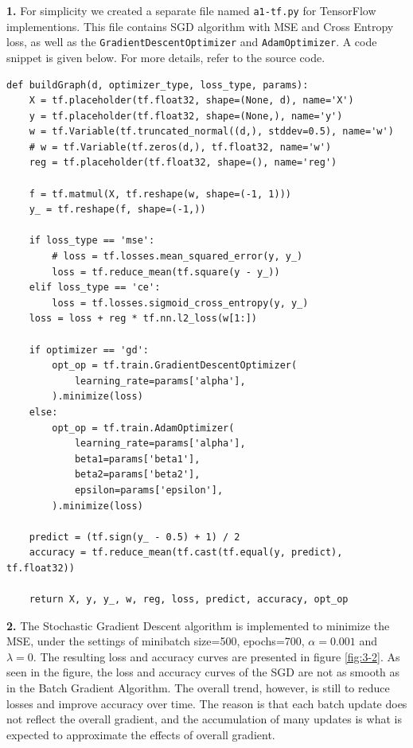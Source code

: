 \documentclass[12pt]{article}
\newenvironment{problem}[2][Problem]{\begin{trivlist}
\item[\hskip \labelsep {\bfseries #1}\hskip \labelsep {\bfseries #2.}]}{\end{trivlist}}
\begin{document}
\vspace{5mm}
\newpage
\begin{problem}{3}

\textbf{1. } For simplicity we created a separate file named \texttt{a1-tf.py} for TensorFlow implementions. This file contains SGD algorithm with MSE and Cross Entropy loss, as well as the \texttt{GradientDescentOptimizer} and \texttt{AdamOptimizer}. A code snippet is given below. For more details, refer to the source code.

\begin{lstlisting}[frame=single]
def buildGraph(d, optimizer_type, loss_type, params):
    X = tf.placeholder(tf.float32, shape=(None, d), name='X')
    y = tf.placeholder(tf.float32, shape=(None,), name='y')
    w = tf.Variable(tf.truncated_normal((d,), stddev=0.5), name='w')
    # w = tf.Variable(tf.zeros(d,), tf.float32, name='w')
    reg = tf.placeholder(tf.float32, shape=(), name='reg')

    f = tf.matmul(X, tf.reshape(w, shape=(-1, 1)))
    y_ = tf.reshape(f, shape=(-1,))

    if loss_type == 'mse':
        # loss = tf.losses.mean_squared_error(y, y_)
        loss = tf.reduce_mean(tf.square(y - y_))
    elif loss_type == 'ce':
        loss = tf.losses.sigmoid_cross_entropy(y, y_)
    loss = loss + reg * tf.nn.l2_loss(w[1:])

    if optimizer == 'gd':
        opt_op = tf.train.GradientDescentOptimizer(
            learning_rate=params['alpha'],
        ).minimize(loss)
    else:
        opt_op = tf.train.AdamOptimizer(
            learning_rate=params['alpha'],
            beta1=params['beta1'],
            beta2=params['beta2'],
            epsilon=params['epsilon'],
        ).minimize(loss)

    predict = (tf.sign(y_ - 0.5) + 1) / 2
    accuracy = tf.reduce_mean(tf.cast(tf.equal(y, predict), tf.float32))

    return X, y, y_, w, reg, loss, predict, accuracy, opt_op

\end{lstlisting}

\bigskip

\textbf{2. } The Stochastic Gradient Descent algorithm is implemented to minimize the MSE, under the settings of minibatch size=500, epochs=700, $\alpha=0.001$ and $\lambda=0$. The resulting loss and accuracy curves are presented in figure \ref{fig:3-2}. As seen in the figure, the loss and accuracy curves of the SGD are not as smooth as in the Batch Gradient Algorithm. The overall trend, however, is still to reduce losses and improve accuracy over time. The reason is that each batch update does not reflect the overall gradient, and the accumulation of many updates is what is expected to approximate the effects of overall gradient.


\end{problem}
\end{document}
